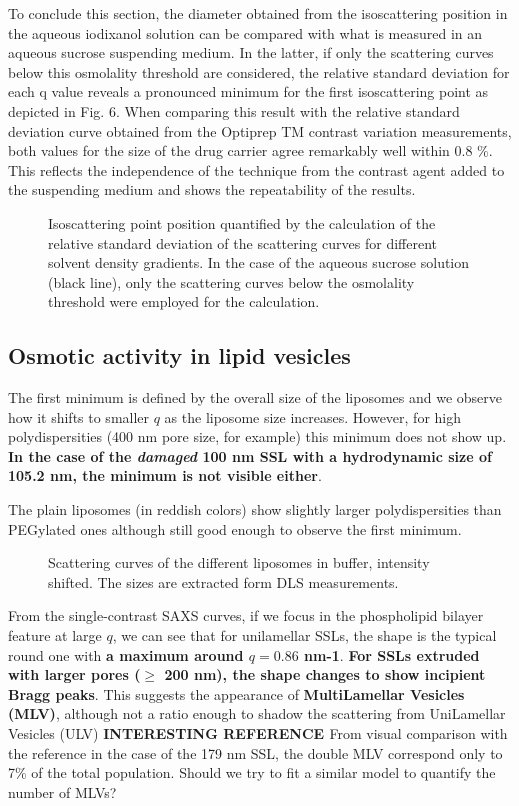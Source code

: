 To conclude this section, the diameter obtained from the isoscattering position in the aqueous iodixanol solution can be compared with what is measured in an aqueous sucrose suspending medium.  In the latter, if only the scattering curves below this osmolality threshold are considered, the relative standard deviation for each q value reveals a pronounced minimum for the first isoscattering point as depicted in Fig. 6. When comparing this result with the relative standard deviation curve obtained from the Optiprep TM contrast variation measurements, both values for the size of the drug carrier agree remarkably well within 0.8 $\%$. This reflects the independence of the technique from the contrast agent added to the suspending medium and shows the repeatability of the results.

\begin{figure}
	\centering
		
		\caption{Isoscattering point position quantified by the calculation of the relative standard deviation of the scattering curves for different solvent density gradients. In the case of the aqueous sucrose solution (black line), only the scattering curves below the osmolality threshold were employed for the calculation.}
		\label{fig:CaelyxIsopointComparison}
\end{figure}

\subsection{Osmotic activity in lipid vesicles}
The first minimum is defined by the overall size of the liposomes and we observe how it shifts to smaller $q$ as the liposome size increases. However, for high polydispersities (400 nm pore size, for example) this minimum does not show up. \textbf{In the case of the \emph{damaged} 100 nm SSL with a hydrodynamic size of 105.2 nm, the minimum is not visible either}.

The plain liposomes (in reddish colors) show slightly larger polydispersities than PEGylated ones although still good enough to observe the first minimum. 


\begin{figure}
	\centering
		
		\caption{Scattering curves of the different liposomes in buffer, intensity shifted. The sizes are extracted form DLS measurements.}
		\label{fig:SSLSingleContrast}
\end{figure}

From the single-contrast SAXS curves, if we focus in the phospholipid bilayer feature at large $q$, we can see that for unilamellar SSLs, the shape is the typical round one with \textbf{a maximum around $q=0.86$ nm-1}. \textbf{For SSLs extruded with larger pores ($\geq$ 200 nm), the shape changes to show incipient Bragg peaks}. This suggests the appearance of \textbf{MultiLamellar Vesicles (MLV)}, although not a ratio enough to shadow the scattering from UniLamellar Vesicles (ULV) \textbf{INTERESTING REFERENCE \cite{sakuragi_transformation_2011}} From visual comparison with the reference in the case of the 179 nm SSL, the double MLV correspond only to 7$\%$ of the total population. Should we try to fit a similar model to quantify the number of MLVs?

